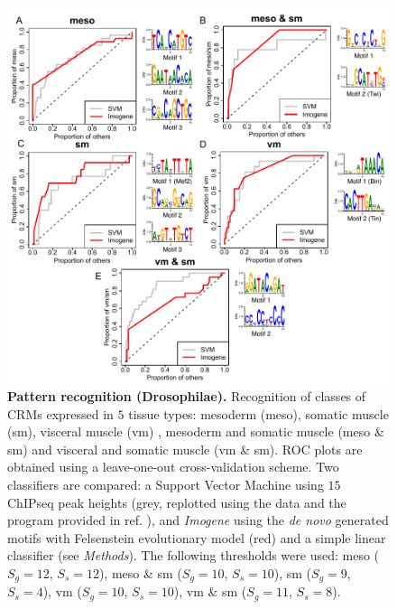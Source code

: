 \documentclass[a4,center,fleqn]{NAR}
\begin{document}
\clearpage
    \begin{figure}[!htbp]
\begin{center}    
\includegraphics[width=15cm]{figuresnar-sub/fig5.pdf}
\end{center}
\caption{\normalsize
    {\bf Pattern recognition (Drosophilae).}     
    Recognition of classes of CRMs expressed in $5$ tissue types: mesoderm
    (meso), somatic muscle (sm), visceral muscle (vm) , mesoderm and somatic
    muscle (meso \& sm) and visceral and somatic muscle (vm \& sm).
    ROC plots are obtained using a leave-one-out cross-validation scheme.
    Two classifiers are compared: a Support Vector Machine using $15$ ChIPseq
    peak heights (grey, replotted using the data and the program provided in
    ref. \cite{pmid19890324}), and {\em Imogene} using the {\it de novo}
    generated motifs with Felsenstein evolutionary model (red) and a simple
    linear classifier (see {\em Methods}).
    The following thresholds were used: meso ($S_g=12$, $S_s=12$), meso \& sm
($S_g=10$, $S_s=10$), sm ($S_g=9$, $S_s=4$), vm ($S_g=10$, $S_s=10$), vm \& sm
($S_g=11$, $S_s=8$).  }
    \label{fig:patterndro}
\end{figure}
\end{document}
